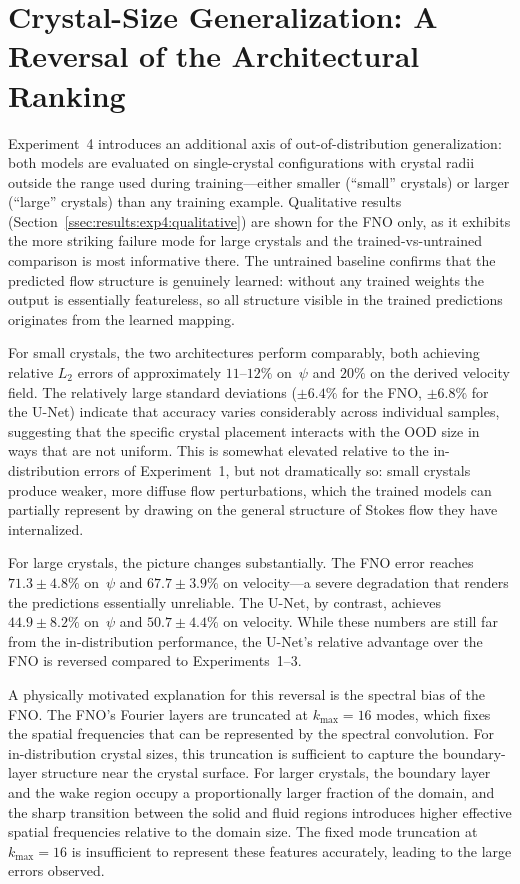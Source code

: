 \section{Crystal-Size Generalization: A Reversal of the Architectural Ranking}

Experiment~4 introduces an additional axis of out-of-distribution generalization: both models are evaluated on single-crystal configurations with crystal radii outside the range used during training—either smaller (``small'' crystals) or larger (``large'' crystals) than any training example. Qualitative results (Section~\ref{ssec:results:exp4:qualitative}) are shown for the FNO only, as it exhibits the more striking failure mode for large crystals and the trained-vs-untrained comparison is most informative there. The untrained baseline confirms that the predicted flow structure is genuinely learned: without any trained weights the output is essentially featureless, so all structure visible in the trained predictions originates from the learned mapping.

For small crystals, the two architectures perform comparably, both achieving relative $L_2$ errors of approximately $11$--$12\%$ on~$\psi$ and $20\%$ on the derived velocity field. The relatively large standard deviations ($\pm 6.4\%$ for the FNO, $\pm 6.8\%$ for the U-Net) indicate that accuracy varies considerably across individual samples, suggesting that the specific crystal placement interacts with the OOD size in ways that are not uniform. This is somewhat elevated relative to the in-distribution errors of Experiment~1, but not dramatically so: small crystals produce weaker, more diffuse flow perturbations, which the trained models can partially represent by drawing on the general structure of Stokes flow they have internalized.

For large crystals, the picture changes substantially. The FNO error reaches $71.3 \pm 4.8\%$ on~$\psi$ and $67.7 \pm 3.9\%$ on velocity—a severe degradation that renders the predictions essentially unreliable. The U-Net, by contrast, achieves $44.9 \pm 8.2\%$ on~$\psi$ and $50.7 \pm 4.4\%$ on velocity. While these numbers are still far from the in-distribution performance, the U-Net's relative advantage over the FNO is reversed compared to Experiments~1--3.

A physically motivated explanation for this reversal is the spectral bias of the FNO. The FNO's Fourier layers are truncated at $k_{\max} = 16$ modes, which fixes the spatial frequencies that can be represented by the spectral convolution. For in-distribution crystal sizes, this truncation is sufficient to capture the boundary-layer structure near the crystal surface. For larger crystals, the boundary layer and the wake region occupy a proportionally larger fraction of the domain, and the sharp transition between the solid and fluid regions introduces higher effective spatial frequencies relative to the domain size. The fixed mode truncation at $k_{\max} = 16$ is insufficient to represent these features accurately, leading to the large errors observed.

